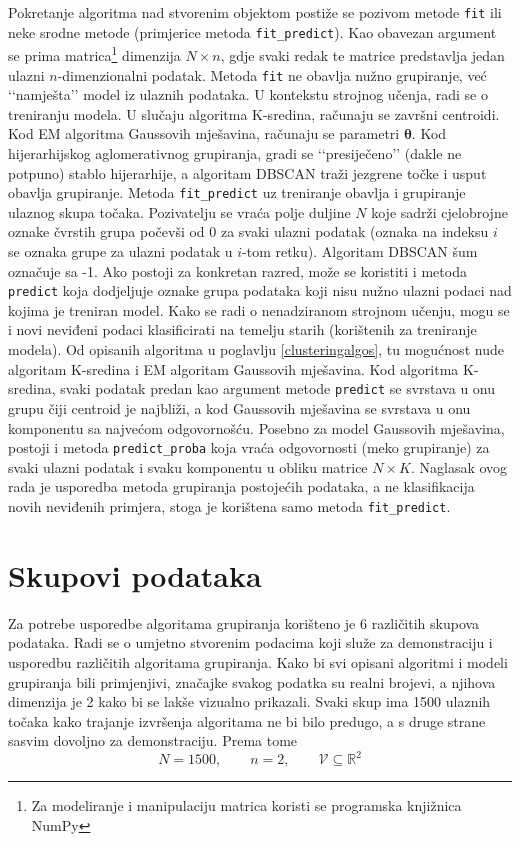 \documentclass[times, utf8, zavrsni]{fer}
\begin{document}
Pokretanje algoritma nad stvorenim objektom postiže se pozivom metode \texttt{fit} ili neke srodne metode (primjerice metoda \texttt{fit\_predict}). Kao obavezan argument se prima matrica\footnote{Za modeliranje i manipulaciju matrica koristi se programska knjižnica NumPy} dimenzija $N \times n$, gdje svaki redak te matrice predstavlja jedan ulazni $n$-dimenzionalni podatak. Metoda \texttt{fit} ne obavlja nužno grupiranje, već ‘‘namješta’’ model iz ulaznih podataka. U kontekstu strojnog učenja, radi se o treniranju modela. U slučaju algoritma K-sredina, računaju se završni centroidi. Kod EM algoritma Gaussovih mješavina, računaju se parametri $\boldsymbol{\theta}$. Kod hijerarhijskog aglomerativnog grupiranja, gradi se ‘‘presiječeno’’ (dakle ne potpuno) stablo hijerarhije, a algoritam DBSCAN traži jezgrene točke i usput obavlja grupiranje. Metoda \texttt{fit\_predict} uz treniranje obavlja i grupiranje ulaznog skupa točaka. Pozivatelju se vraća polje duljine $N$ koje sadrži cjelobrojne oznake čvrstih grupa počevši od 0 za svaki ulazni podatak (oznaka na indeksu $i$ se oznaka grupe za ulazni podatak u $i$-tom retku). Algoritam DBSCAN šum označuje sa -1. Ako postoji za konkretan razred, može se koristiti i metoda \texttt{predict} koja dodjeljuje oznake grupa podataka koji nisu nužno ulazni podaci nad kojima je treniran model. Kako se radi o nenadziranom strojnom učenju, mogu se i novi neviđeni podaci klasificirati na temelju starih (korištenih za treniranje modela). Od opisanih algoritma u poglavlju \ref{clusteringalgos}, tu mogućnost nude algoritam K-sredina i EM algoritam Gaussovih mješavina. Kod algoritma K-sredina, svaki podatak predan kao argument metode \texttt{predict} se svrstava u onu grupu čiji centroid je najbliži, a kod Gaussovih mješavina se svrstava u onu komponentu sa najvećom odgovornošću. Posebno za model Gaussovih mješavina, postoji i metoda \texttt{predict\_proba} koja vraća odgovornosti (meko grupiranje) za svaki ulazni podatak i svaku komponentu u obliku matrice $N \times K$. Naglasak ovog rada je usporedba metoda grupiranja postojećih podataka, a ne klasifikacija novih neviđenih primjera, stoga je korištena samo metoda \texttt{fit\_predict}.

\section{Skupovi podataka}
Za potrebe usporedbe algoritama grupiranja korišteno je 6 različitih skupova podataka. Radi se o umjetno stvorenim podacima koji služe za demonstraciju i usporedbu različitih algoritama grupiranja. Kako bi svi opisani algoritmi i modeli grupiranja bili primjenjivi, značajke svakog podatka su realni brojevi, a njihova dimenzija je 2 kako bi se lakše vizualno prikazali. Svaki skup ima 1500 ulaznih točaka kako trajanje izvršenja algoritama ne bi bilo predugo, a s druge strane sasvim dovoljno za demonstraciju. Prema tome
\[N = 1500, \qquad n = 2, \qquad \mathcal{V} \subseteq \mathbb{R}^2\]
\end{document}
